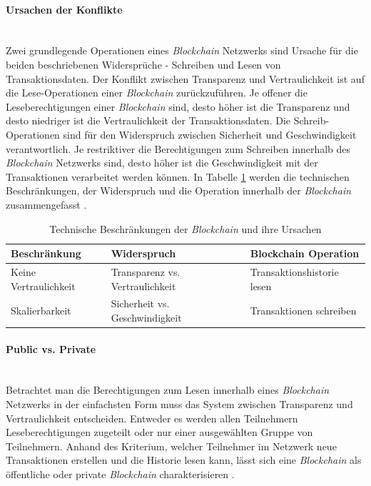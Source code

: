 \paragraph{Ursachen der Konflikte}$~~$\\
Zwei grundlegende Operationen eines \textit{Blockchain} Netzwerks sind Ursache für die beiden beschriebenen Widersprüche - Schreiben und Lesen von Transaktionsdaten. Der Konflikt zwischen Transparenz und Vertraulichkeit ist auf die Lese-Operationen einer \textit{Blockchain} zurückzuführen. Je offener die Leseberechtigungen einer \textit{Blockchain} sind, desto höher ist die Transparenz und desto niedriger ist die Vertraulichkeit der Transaktionsdaten. Die Schreib-Operationen sind für den Widerspruch zwischen Sicherheit und Geschwindigkeit verantwortlich. Je restriktiver die Berechtigungen zum Schreiben innerhalb des \textit{Blockchain} Netzwerks sind, desto höher ist die Geschwindigkeit mit der Transaktionen verarbeitet werden können. In Tabelle \ref{tab:technical-restricts-blockchain} werden die technischen Beschränkungen, der Widerspruch und die Operation innerhalb der \textit{Blockchain} zusammengefasst \citep{Drescher2017}.

\begin{table}[htb]\centering
  \begin{tabularx}{\textwidth}{XXX}
    \toprule
    \textbf{Beschränkung} &\textbf{Widerspruch} &\textbf{Blockchain Operation}\\ \midrule
    Keine Vertraulichkeit & Transparenz vs. Vertraulichkeit & Transaktionshistorie lesen\\ \addlinespace
    Skalierbarkeit & Sicherheit vs. Geschwindigkeit & Transaktionen schreiben\\
    \bottomrule
  \end{tabularx}
  \caption{Technische Beschränkungen der \textit{Blockchain} und ihre Ursachen}
  \label{tab:technical-restricts-blockchain}
\end{table}

\paragraph{Public vs. Private}$~~$\\
Betrachtet man die Berechtigungen zum Lesen innerhalb eines \textit{Blockchain} Netzwerks in der einfachsten Form muss das System zwischen Transparenz und Vertraulichkeit entscheiden. Entweder es werden allen Teilnehmern Leseberechtigungen zugeteilt oder nur einer ausgewählten Gruppe von Teilnehmern. Anhand des Kriterium, welcher Teilnehmer im Netzwerk neue Transaktionen erstellen und die Historie lesen kann, lässt sich eine \textit{Blockchain} als öffentliche oder private \textit{Blockchain} charakterisieren \citep{Drescher2017}.

